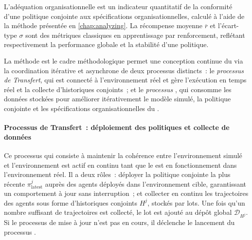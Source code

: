 L'adéquation organisationnelle est un indicateur quantitatif de la conformité d'une politique conjointe aux spécifications organisationnelles, calculé à l'aide de la méthode  présentée en \autoref{chap:analyzing}. La récompense moyenne $\overline{r}$ et l'écart-type $\sigma$ sont des métriques classiques en apprentissage par renforcement, reflétant respectivement la performance globale et la stabilité d'une politique.


La méthode  est le cadre méthodologique permet une conception continue du  via la coordination itérative et asynchrone de deux processus distincts~: le \textit{processus de Transfert}, qui est connecté à l'environnement réel et gère l'exécution en temps réel et la collecte d'historiques conjoints~; et le \textit{processus }, qui consomme les données stockées pour améliorer itérativement le modèle simulé, la politique conjointe et les spécifications organisationnelles du .

\paragraph{Processus de Transfert~: déploiement des politiques et collecte de données}

Ce processus qui consiste à maintenir la cohérence entre l'environnement simulé et l'environnement est actif en continu tant que le  est en fonctionnement dans l'environnement réel. Il a deux rôles~: déployer la politique conjointe la plus récente $\pi^j_{\text{latest}}$ auprès des agents déployés dans l'environnement cible, garantissant un comportement à jour sans interruption~; et collecter en continu les trajectoires des agents sous forme d'historiques conjoints $H^j$, stockés par lots. Une fois qu'un nombre suffisant de trajectoires est collecté, le lot est ajouté au dépôt global $\mathcal{D}_{H^j}$. Si le processus de mise à jour n'est pas en cours, il déclenche le lancement du processus \textit{}.


